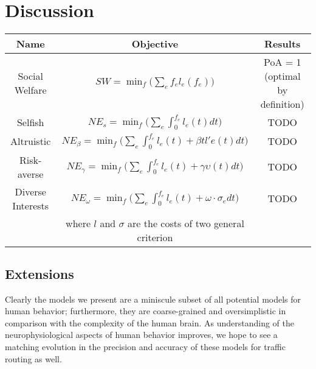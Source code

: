 \section{Discussion}\label{sec:discussion}

\begin{table}
\begin{center}
 \begin{tabular}{|c | c | c|} 
 \hline
 Name & Objective & Results \\
 \hline\hline
     Social Welfare & $SW = \min_f\Big(\sum_e f_el_e(f_e)\Big)$ & PoA = 1 (optimal by definition) \\
 \hline
     Selfish & $NE_s = \min_f\Big(\sum_e\int_0^{f_e} l_e(t)dt\Big)$ & TODO\\
 \hline
     Altruistic & $NE_\beta = \min_f\Big(\sum_e\int_0^{f_e} l_e(t) + \beta tl'e(t)dt\Big)$ & TODO\\
\hline
     Risk-averse & $NE_\gamma = \min_f\Big(\sum_e\int_0^{f_e} l_e(t) + \gamma\upsilon(t)dt\Big)$ & TODO\\
\hline
     Diverse Interests & $NE_\omega = \min_f\Big(\sum_e\int_0^{f_e} l_e(t) + \omega\cdot \sigma_e dt\Big)$ & TODO\\
     & where $l$ and $\sigma$ are the costs of two general criterion &\\
\hline
\end{tabular}
\end{center}
\end{table}

\subsection{Extensions}
Clearly the models we present are a miniscule subset of all potential models for human behavior; 
furthermore, they are coarse-grained and oversimplistic in comparison with the complexity of the human
brain. As understanding of the neurophysiological aspects of human behavior improves, we hope to see a matching evolution in the precision and accuracy of these models for traffic routing as well.
